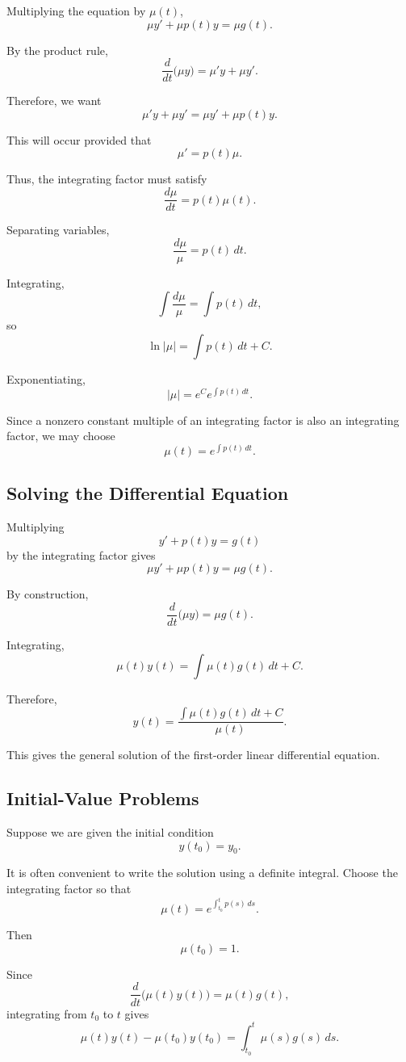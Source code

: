 \documentclass[11pt]{article}
\begin{document}
Multiplying the equation by \(\mu(t)\),
\[
\mu y'+\mu p(t)y=\mu g(t).
\]

By the product rule,
\[
\frac{d}{dt}\bigl(\mu y\bigr)
=
\mu' y+\mu y'.
\]

Therefore, we want
\[
\mu' y+\mu y'
=
\mu y'+\mu p(t)y.
\]

This will occur provided that
\[
\mu'=p(t)\mu.
\]

Thus, the integrating factor must satisfy
\[
\frac{d\mu}{dt}=p(t)\mu(t).
\]

Separating variables,
\[
\frac{d\mu}{\mu}=p(t)\,dt.
\]

Integrating,
\[
\int\frac{d\mu}{\mu}
=
\int p(t)\,dt,
\]
so
\[
\ln|\mu|
=
\int p(t)\,dt+C.
\]

Exponentiating,
\[
|\mu|
=
e^C e^{\int p(t)\,dt}.
\]

Since a nonzero constant multiple of an integrating factor is also an
integrating factor, we may choose
\[
\boxed{
\mu(t)=e^{\int p(t)\,dt}
}.
\]

\subsection{Solving the Differential Equation}

Multiplying
\[
y'+p(t)y=g(t)
\]
by the integrating factor gives
\[
\mu y'+\mu p(t)y=\mu g(t).
\]

By construction,
\[
\frac{d}{dt}\bigl(\mu y\bigr)=\mu g(t).
\]

Integrating,
\[
\mu(t)y(t)
=
\int \mu(t)g(t)\,dt+C.
\]

Therefore,
\[
\boxed{
y(t)
=
\frac{
\displaystyle
\int \mu(t)g(t)\,dt+C
}{
\mu(t)
}
}.
\]

This gives the general solution of the first-order linear differential
equation.

\subsection{Initial-Value Problems}

Suppose we are given the initial condition
\[
y(t_0)=y_0.
\]

It is often convenient to write the solution using a definite integral.
Choose the integrating factor so that
\[
\mu(t)
=
e^{\int_{t_0}^{t}p(s)\,ds}.
\]

Then
\[
\mu(t_0)=1.
\]

Since
\[
\frac{d}{dt}\bigl(\mu(t)y(t)\bigr)
=
\mu(t)g(t),
\]
integrating from \(t_0\) to \(t\) gives
\[
\mu(t)y(t)-\mu(t_0)y(t_0)
=
\int_{t_0}^{t}\mu(s)g(s)\,ds.
\]
\end{document}

